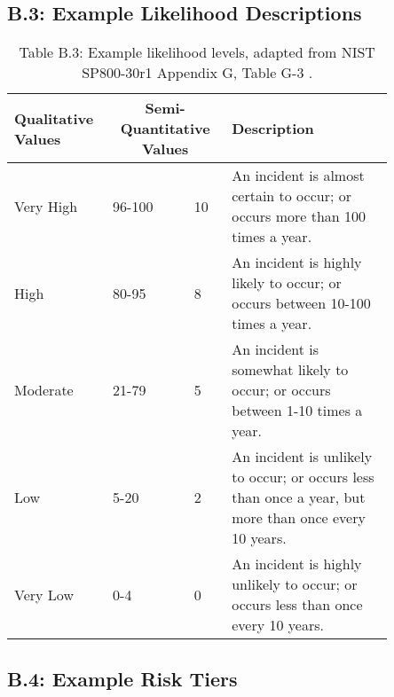 \documentclass[fleqn]{article}
\begin{document}
\subsection*{B.3: Example Likelihood Descriptions}

\begin{table}[H]
	\caption*{Table B.3: Example likelihood levels, adapted from NIST SP800-30r1 Appendix G, Table G-3 \cite{nist80030r1}.}
	\begin{tabular}{|m{0.20\linewidth} |m{0.20\linewidth} | m{0.05\linewidth} | m{0.40\linewidth}|}
		\hline
		\textbf{Qualitative Values} & \multicolumn{2}{c|}{\textbf{Semi-Quantitative Values}} & \textbf{Description} \\
		\hline
		Very High & 96-100 & 10 & An incident is almost certain to occur; or occurs more than 100 times a year. \\
		\hline
		High & 80-95 & 8 & An incident is highly likely to occur; or occurs between 10-100 times a year.\\
		\hline		
		Moderate & 21-79 & 5 & An incident is somewhat likely to occur; or occurs between 1-10 times a year.\\
		\hline
		Low & 5-20 & 2 & An incident is unlikely to occur; or occurs less than once a year, but more than once every 10 years.  \\
		\hline
		Very Low & 0-4 & 0 & An incident is highly unlikely to occur; or occurs less than once every 10 years. \\
		\hline
	\end{tabular}
	\label{table:nist_likelihood}
\end{table}

\subsection*{B.4: Example Risk Tiers}
\end{document}

